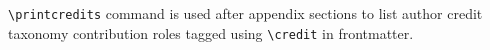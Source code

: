 \documentclass[a4paper,fleqn]{cas-dc}
\begin{document}
\verb+\printcredits+ command is used after appendix sections to list 
author credit taxonomy contribution roles tagged using \verb+\credit+ 
in frontmatter.

\printcredits

%








\end{document}
